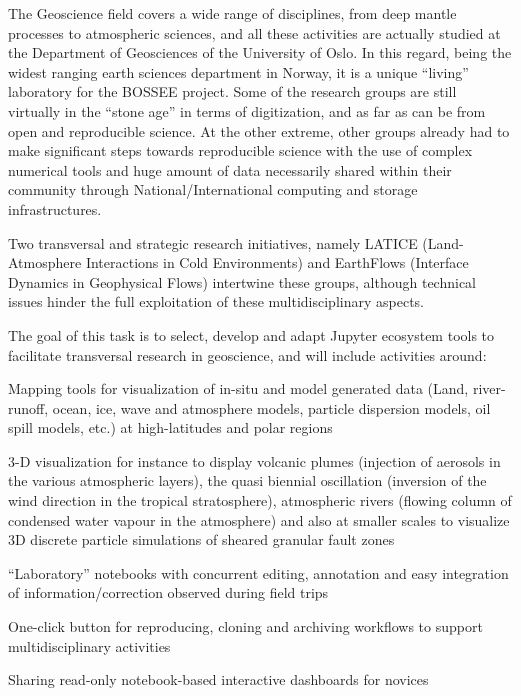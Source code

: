 \begin{task}[
  title=Geosciences application,
  id=geoscience,
  lead=UIO,
  PM=24,
  wphases={0-48},
  partners={UIO,QS,SRL}
]



The Geoscience field covers a wide range of disciplines, from deep mantle processes to atmospheric sciences, and all these activities are 
actually studied at the Department of Geosciences of the University of Oslo. In this regard, being the widest ranging earth sciences 
department in Norway, it is a unique “living” laboratory for the BOSSEE project. Some of the research groups are still virtually in the 
“stone age” in terms of digitization, and as far as can be from open and reproducible science. At the other extreme, other groups already 
had to make significant steps towards reproducible science with the use of complex numerical tools and huge amount of data necessarily 
shared within their community through National/International computing and storage infrastructures.

Two transversal and strategic research initiatives, namely LATICE (Land-Atmosphere Interactions in Cold Environments) and EarthFlows (Interface Dynamics in Geophysical Flows) intertwine these groups, although technical issues hinder the full exploitation of these multidisciplinary aspects.

The goal of this task is to select, develop and adapt Jupyter ecosystem tools to facilitate transversal research in geoscience, and will include activities around:

  \begin{compactitem}
  \item Mapping tools for visualization of in-situ and model generated data (Land, river-runoff, ocean, ice, wave and atmosphere models, particle dispersion models, oil spill models, etc.)  at high-latitudes and polar regions

  \item 3-D visualization for instance to display volcanic plumes (injection of aerosols in the various atmospheric layers), the quasi biennial oscillation (inversion of the wind direction in the tropical stratosphere), atmospheric rivers (flowing column of condensed water vapour in the atmosphere) and also at smaller scales to visualize 3D discrete particle simulations of sheared granular fault zones
   \item “Laboratory” notebooks with concurrent editing, annotation and easy integration of information/correction observed during field trips
   \item One-click button for reproducing, cloning and archiving workflows to support multidisciplinary activities
   \item Sharing read-only notebook-based interactive dashboards for novices


\end{compactitem}
\end{task}
